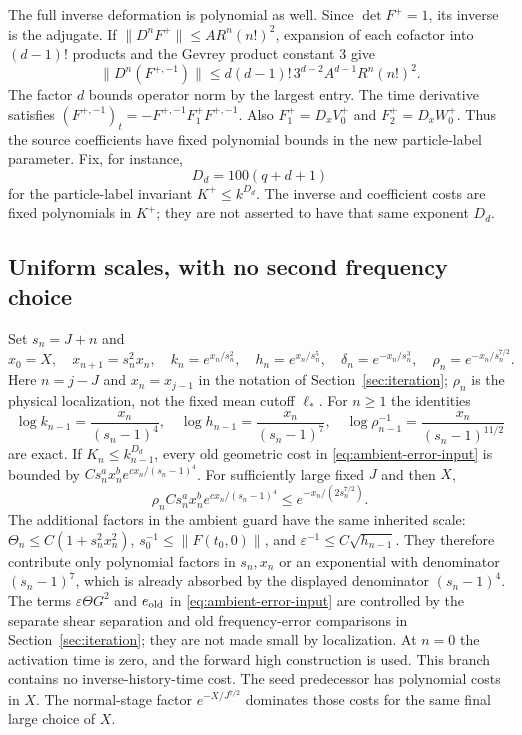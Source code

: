 The full inverse deformation is polynomial as well. Since
$\det F^+=1$, its inverse is the adjugate. If
$\|D^nF^+\|\leq A R^n(n!)^2$, expansion of each cofactor into
$(d-1)!$ products and the Gevrey product constant 3 give
\[
 \|D^n(F^{+,-1})\|
 \leq d(d-1)!\,3^{d-2}A^{d-1}R^n(n!)^2.
\]
The factor $d$ bounds operator norm by the largest entry.
The time derivative satisfies
$(F^{+,-1})_t=-F^{+,-1}F_1^+F^{+,-1}$.
Also $F_1^+=D_xV_0^+$ and $F_2^+=D_xW_0^+$.
Thus the source coefficients have fixed polynomial bounds in the
new particle-label parameter. Fix, for instance,
\[
 D_d=100(q+d+1)
\]
for the particle-label invariant $K^+\leq k^{D_d}$.
The inverse and coefficient costs are fixed polynomials in $K^+$;
they are not asserted to have that same exponent $D_d$.

\subsection{Uniform scales, with no second frequency choice}

Set $s_n=J+n$ and
\[
 x_0=X,\quad x_{n+1}=s_n^2x_n,\quad
 k_n=e^{x_n/s_n^2},\quad h_n=e^{x_n/s_n^5},\quad
 \delta_n=e^{-x_n/s_n^3},\quad\rho_n=e^{-x_n/s_n^{7/2}}.
\]
Here $n=j-J$ and $x_n=x_{j-1}$ in the notation of
Section~\ref{sec:iteration}; $\rho_n$ is the physical localization,
not the fixed mean cutoff $\ell_*$. For $n\geq1$ the identities
\[
 \log k_{n-1}=\frac{x_n}{(s_n-1)^4},\quad
 \log h_{n-1}=\frac{x_n}{(s_n-1)^7},\quad
 \log\rho_{n-1}^{-1}=\frac{x_n}{(s_n-1)^{11/2}}
\]
are exact. If $K_n\leq k_{n-1}^{D_d}$, every old geometric cost in
\eqref{eq:ambient-error-input} is bounded by
$Cs_n^a x_n^b e^{c x_n/(s_n-1)^4}$.
For sufficiently large fixed $J$ and then $X$,
\[
 \rho_n Cs_n^a x_n^b e^{c x_n/(s_n-1)^4}
 \leq e^{-x_n/(2s_n^{7/2})}.
\]
The additional factors in the ambient guard have the same inherited
scale: $\Theta_n\leq C(1+s_n^2x_n^2)$,
$s_0^{-1}\leq\|F(t_0,0)\|$, and
$\varepsilon^{-1}\leq C\sqrt{h_{n-1}}$.
They therefore contribute only polynomial factors in $s_n,x_n$ or an
exponential with denominator $(s_n-1)^7$, which is already absorbed
by the displayed denominator $(s_n-1)^4$. The terms
$\varepsilon\Theta G^2$ and $e_{\rm old}$ in
\eqref{eq:ambient-error-input} are controlled by the separate shear
separation and old frequency-error comparisons in
Section~\ref{sec:iteration}; they are not made small by localization.
At $n=0$ the activation time is zero, and the forward high construction
is used. This branch contains no inverse-history-time cost.
The seed predecessor has polynomial costs in $X$. The normal-stage factor $e^{-X/J^{7/2}}$ dominates those costs for the
same final large choice of $X$.

